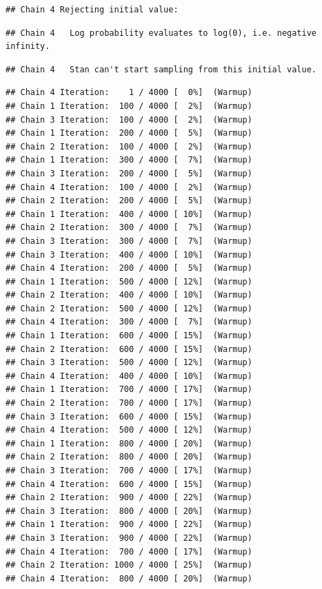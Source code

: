 \documentclass[
]{article}
\begin{document}
\begin{verbatim}
## Chain 4 Rejecting initial value:
\end{verbatim}

\begin{verbatim}
## Chain 4   Log probability evaluates to log(0), i.e. negative infinity.
\end{verbatim}

\begin{verbatim}
## Chain 4   Stan can't start sampling from this initial value.
\end{verbatim}

\begin{verbatim}
## Chain 4 Iteration:    1 / 4000 [  0%]  (Warmup) 
## Chain 1 Iteration:  100 / 4000 [  2%]  (Warmup) 
## Chain 3 Iteration:  100 / 4000 [  2%]  (Warmup) 
## Chain 1 Iteration:  200 / 4000 [  5%]  (Warmup) 
## Chain 2 Iteration:  100 / 4000 [  2%]  (Warmup) 
## Chain 1 Iteration:  300 / 4000 [  7%]  (Warmup) 
## Chain 3 Iteration:  200 / 4000 [  5%]  (Warmup) 
## Chain 4 Iteration:  100 / 4000 [  2%]  (Warmup) 
## Chain 2 Iteration:  200 / 4000 [  5%]  (Warmup) 
## Chain 1 Iteration:  400 / 4000 [ 10%]  (Warmup) 
## Chain 2 Iteration:  300 / 4000 [  7%]  (Warmup) 
## Chain 3 Iteration:  300 / 4000 [  7%]  (Warmup) 
## Chain 3 Iteration:  400 / 4000 [ 10%]  (Warmup) 
## Chain 4 Iteration:  200 / 4000 [  5%]  (Warmup) 
## Chain 1 Iteration:  500 / 4000 [ 12%]  (Warmup) 
## Chain 2 Iteration:  400 / 4000 [ 10%]  (Warmup) 
## Chain 2 Iteration:  500 / 4000 [ 12%]  (Warmup) 
## Chain 4 Iteration:  300 / 4000 [  7%]  (Warmup) 
## Chain 1 Iteration:  600 / 4000 [ 15%]  (Warmup) 
## Chain 2 Iteration:  600 / 4000 [ 15%]  (Warmup) 
## Chain 3 Iteration:  500 / 4000 [ 12%]  (Warmup) 
## Chain 4 Iteration:  400 / 4000 [ 10%]  (Warmup) 
## Chain 1 Iteration:  700 / 4000 [ 17%]  (Warmup) 
## Chain 2 Iteration:  700 / 4000 [ 17%]  (Warmup) 
## Chain 3 Iteration:  600 / 4000 [ 15%]  (Warmup) 
## Chain 4 Iteration:  500 / 4000 [ 12%]  (Warmup) 
## Chain 1 Iteration:  800 / 4000 [ 20%]  (Warmup) 
## Chain 2 Iteration:  800 / 4000 [ 20%]  (Warmup) 
## Chain 3 Iteration:  700 / 4000 [ 17%]  (Warmup) 
## Chain 4 Iteration:  600 / 4000 [ 15%]  (Warmup) 
## Chain 2 Iteration:  900 / 4000 [ 22%]  (Warmup) 
## Chain 3 Iteration:  800 / 4000 [ 20%]  (Warmup) 
## Chain 1 Iteration:  900 / 4000 [ 22%]  (Warmup) 
## Chain 3 Iteration:  900 / 4000 [ 22%]  (Warmup) 
## Chain 4 Iteration:  700 / 4000 [ 17%]  (Warmup) 
## Chain 2 Iteration: 1000 / 4000 [ 25%]  (Warmup) 
## Chain 4 Iteration:  800 / 4000 [ 20%]  (Warmup) 

\end{verbatim}
\end{document}
